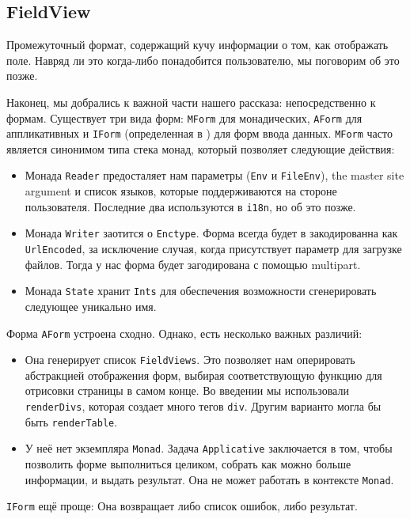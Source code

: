 \subsection{FieldView}
Промежуточный формат, содержащий кучу информации о том, как отображать поле. Навряд ли
это когда-либо понадобится пользователю, мы поговорим об это позже.

Наконец, мы добрались к важной части нашего рассказа: непосредственно к формам. Существует
три вида форм: \lstinline'MForm' для монадических, \lstinline'AForm' для аппликативных и
\lstinline'IForm' (определенная в 
) для форм ввода
данных. \lstinline'MForm' часто является синонимом типа стека монад, который позволяет
следующие действия:
\begin{itemize}
\item Монада \lstinline'Reader' предосталяет нам параметры (\lstinline'Env' и 
\lstinline'FileEnv'), the master site argument и список языков, которые поддерживаются на
стороне пользователя. Последние два используются в \lstinline'i18n', но об это позже.

\item Монада \lstinline'Writer' заотится о \lstinline'Enctype'. Форма всегда будет в
закодированна как  \lstinline'UrlEncoded', за исключение случая, когда присутствует
параметр для загрузке файлов. Тогда у нас форма будет загодирована с помощью multipart.
\item Монада \lstinline'State' хранит \lstinline'Ints' для обеспечения возможности
сгенерировать следующее уникально имя.
\end{itemize}
Форма \lstinline'AForm' устроена сходно. Однако, есть несколько важных различий:
\begin{itemize}
\item Она генерирует список \lstinline'FieldViews'. Это позволяет нам оперировать
абстракцией отображения форм, выбирая соответствующую функцию для отрисовки страницы в
самом конце. Во введении мы использовали \lstinline'renderDivs', которая создает
много тегов \lstinline'div'. Другим варианто могла бы быть 
\lstinline'renderTable'.

\item У неё нет экземпляра \lstinline'Monad'. Задача \lstinline'Applicative' заключается
в том, чтобы позволить форме выполниться целиком, собрать как можно больше информации, и
выдать результат. Она не может работать в контексте \lstinline'Monad'.
\end{itemize}
\lstinline'IForm' ещё проще: Она возвращает либо список ошибок, либо результат.

